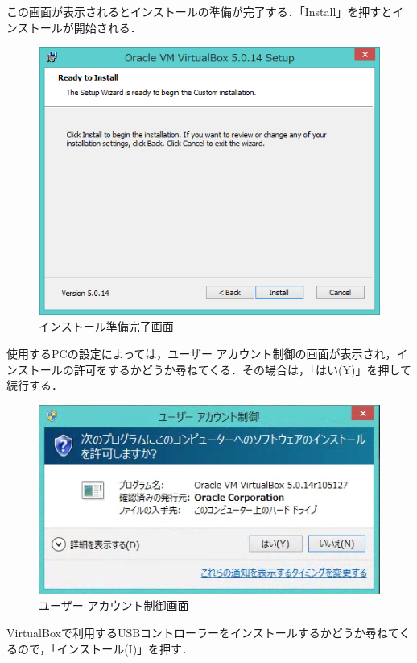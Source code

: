 この画面が表示されるとインストールの準備が完了する．「Install」を押すとインストールが開始される．

\begin{figure}[H]
\centering
\includegraphics[width=13cm]{vboxinstall_ready.PNG}
\caption{インストール準備完了画面}\label{vboxinstallready}
\end{figure}

使用するPCの設定によっては，ユーザー アカウント制御の画面が表示され，インストールの許可をするかどうか尋ねてくる．その場合は，「はい(Y)」を押して続行する．

\begin{figure}[H]
\centering
\includegraphics[width=13cm]{vboxinstall_uac.PNG}
\caption{ユーザー アカウント制御画面}\label{vboxinstalluac}
\end{figure}

VirtualBoxで利用するUSBコントローラーをインストールするかどうか尋ねてくるので，「インストール(I)」を押す．

